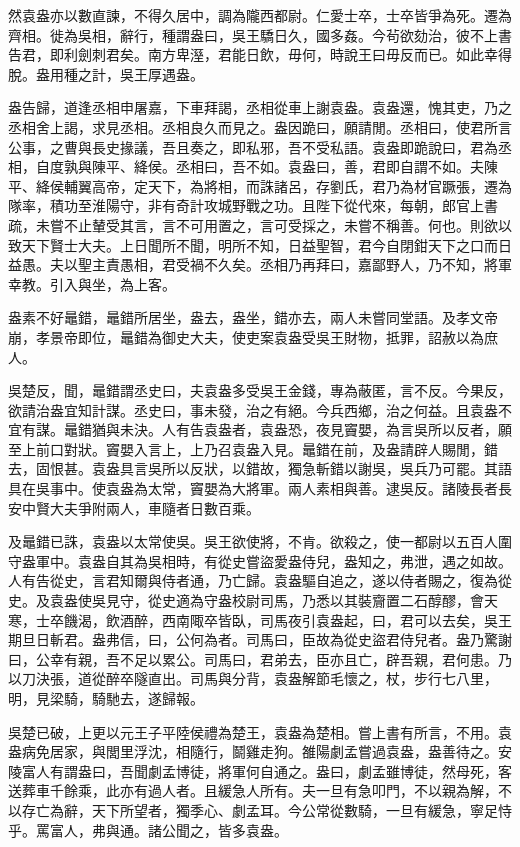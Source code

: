 然袁盎亦以數直諫，不得久居中，調為隴西都尉。仁愛士卒，士卒皆爭為死。遷為齊相。徙為吳相，辭行，種謂盎曰，吳王驕日久，國多姦。今茍欲劾治，彼不上書告君，即利劍刺君矣。南方卑溼，君能日飲，毋何，時說王曰毋反而已。如此幸得脫。盎用種之計，吳王厚遇盎。

盎告歸，道逢丞相申屠嘉，下車拜謁，丞相從車上謝袁盎。袁盎還，愧其吏，乃之丞相舍上謁，求見丞相。丞相良久而見之。盎因跪曰，願請閒。丞相曰，使君所言公事，之曹與長史掾議，吾且奏之，即私邪，吾不受私語。袁盎即跪說曰，君為丞相，自度孰與陳平、絳侯。丞相曰，吾不如。袁盎曰，善，君即自謂不如。夫陳平、絳侯輔翼高帝，定天下，為將相，而誅諸呂，存劉氏，君乃為材官蹶張，遷為隊率，積功至淮陽守，非有奇計攻城野戰之功。且陛下從代來，每朝，郎官上書疏，未嘗不止輦受其言，言不可用置之，言可受採之，未嘗不稱善。何也。則欲以致天下賢士大夫。上日聞所不聞，明所不知，日益聖智，君今自閉鉗天下之口而日益愚。夫以聖主責愚相，君受禍不久矣。丞相乃再拜曰，嘉鄙野人，乃不知，將軍幸教。引入與坐，為上客。

盎素不好鼂錯，鼂錯所居坐，盎去，盎坐，錯亦去，兩人未嘗同堂語。及孝文帝崩，孝景帝即位，鼂錯為御史大夫，使吏案袁盎受吳王財物，抵罪，詔赦以為庶人。

吳楚反，聞，鼂錯謂丞史曰，夫袁盎多受吳王金錢，專為蔽匿，言不反。今果反，欲請治盎宜知計謀。丞史曰，事未發，治之有絕。今兵西鄉，治之何益。且袁盎不宜有謀。鼂錯猶與未決。人有告袁盎者，袁盎恐，夜見竇嬰，為言吳所以反者，願至上前口對狀。竇嬰入言上，上乃召袁盎入見。鼂錯在前，及盎請辟人賜閒，錯去，固恨甚。袁盎具言吳所以反狀，以錯故，獨急斬錯以謝吳，吳兵乃可罷。其語具在吳事中。使袁盎為太常，竇嬰為大將軍。兩人素相與善。逮吳反。諸陵長者長安中賢大夫爭附兩人，車隨者日數百乘。

及鼂錯已誅，袁盎以太常使吳。吳王欲使將，不肯。欲殺之，使一都尉以五百人圍守盎軍中。袁盎自其為吳相時，有從史嘗盜愛盎侍兒，盎知之，弗泄，遇之如故。人有告從史，言君知爾與侍者通，乃亡歸。袁盎驅自追之，遂以侍者賜之，復為從史。及袁盎使吳見守，從史適為守盎校尉司馬，乃悉以其裝齎置二石醇醪，會天寒，士卒饑渴，飲酒醉，西南陬卒皆臥，司馬夜引袁盎起，曰，君可以去矣，吳王期旦日斬君。盎弗信，曰，公何為者。司馬曰，臣故為從史盜君侍兒者。盎乃驚謝曰，公幸有親，吾不足以累公。司馬曰，君弟去，臣亦且亡，辟吾親，君何患。乃以刀決張，道從醉卒隧直出。司馬與分背，袁盎解節毛懷之，杖，步行七八里，明，見梁騎，騎馳去，遂歸報。

吳楚已破，上更以元王子平陸侯禮為楚王，袁盎為楚相。嘗上書有所言，不用。袁盎病免居家，與閭里浮沈，相隨行，鬬雞走狗。雒陽劇孟嘗過袁盎，盎善待之。安陵富人有謂盎曰，吾聞劇孟博徒，將軍何自通之。盎曰，劇孟雖博徒，然母死，客送葬車千餘乘，此亦有過人者。且緩急人所有。夫一旦有急叩門，不以親為解，不以存亡為辭，天下所望者，獨季心、劇孟耳。今公常從數騎，一旦有緩急，寧足恃乎。罵富人，弗與通。諸公聞之，皆多袁盎。

